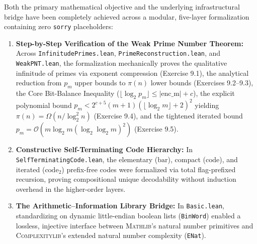 \documentclass[acmsmall,natbib=false,nonacm]{acmart}
\begin{document}
Both the primary mathematical objective and the underlying infrastructural bridge have been completely achieved across a modular, five-layer formalization containing zero \texttt{sorry} placeholders:
\begin{enumerate}
    \item \textbf{Step-by-Step Verification of the Weak Prime Number Theorem:} Across \texttt{InfinitudePrimes.lean}, \texttt{PrimeReconstruction.lean}, and \texttt{WeakPNT.lean}, the formalization mechanically proves the qualitative infinitude of primes via exponent compression (Exercise 9.1), the analytical reduction from $p_m$ upper bounds to $\pi(n)$ lower bounds (Exercises 9.2--9.3), the Core Bit-Balance Inequality ($\lfloor\log_2 p_m\rfloor \le |\text{enc\_m}| + c$), the explicit polynomial bound $p_m < 2^{c+5}(m+1)(\lfloor\log_2 m\rfloor + 2)^2$ yielding $\pi(n) = \Omega(n / \log_2^2 n)$ (Exercise 9.4), and the tightened iterated bound $p_m = \mathcal{O}(m \log_2 m (\log_2 \log_2 m)^2)$ (Exercise 9.5).
    \item \textbf{Constructive Self-Terminating Code Hierarchy:} In \texttt{SelfTerminatingCode.lean}, the elementary ($\text{bar}$), compact ($\text{code}$), and iterated ($\text{code}_2$) prefix-free codes were formalized via total flag-prefixed recursion, proving compositional unique decodability without induction overhead in the higher-order layers.
    \item \textbf{The Arithmetic--Information Library Bridge:} In \texttt{Basic.lean}, standardizing on dynamic little-endian boolean lists (\texttt{BinWord}) enabled a lossless, injective interface between \textsc{Mathlib}'s natural number primitives and \textsc{Complexitylib}'s extended natural number complexity (\texttt{ENat}).
\end{enumerate}
\end{document}

